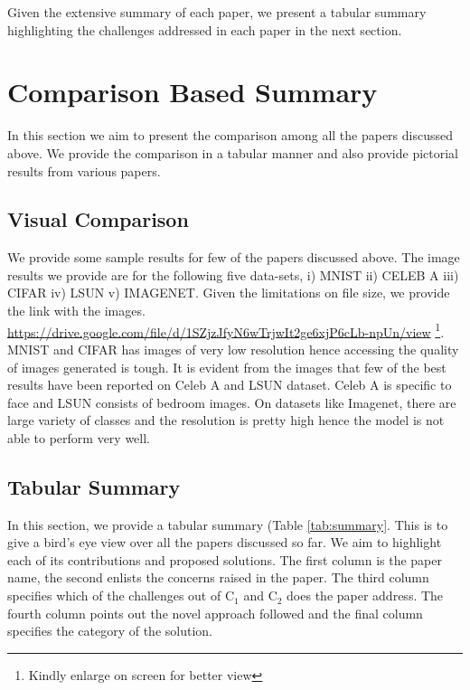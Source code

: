Given the extensive summary of each paper, we present a tabular summary highlighting the challenges addressed in each paper in the next section.




\section{Comparison Based Summary}
\label{sec:comparison}
In this section we aim to present the comparison among all the papers discussed above. We provide the comparison in a tabular manner and also provide pictorial results from various papers.

\subsection{Visual Comparison}
\label{sec:vis_summary}
We provide some sample results for few of the papers discussed above. The image results we provide are for the following five data-sets, i) MNIST ii) CELEB A iii) CIFAR iv) LSUN v) IMAGENET.
Given the limitations on file size, we provide the link with the images.
\url{https://drive.google.com/file/d/1SZjzJfyN6wTrjwIt2ge6xjP6cLb-npUn/view} \footnote{Kindly enlarge on screen for better view}. MNIST and CIFAR has images of very low resolution hence accessing the quality of images generated is tough. It is evident from the images that few of the best results have been reported on Celeb A and LSUN dataset. Celeb A is specific to face and LSUN consists of bedroom images. On datasets like Imagenet, there are large variety of classes and the resolution is pretty high hence the model is not able to perform very well.  
\subsection{Tabular Summary}
\label{ssec:tab_summary}

In this section, we provide a tabular summary (Table \ref{tab:summary}. This is to give a bird's eye view over all the papers discussed so far. We aim to highlight each of its contributions and proposed solutions. The first column is the paper name, the second enlists the concerns raised in the paper. The third column specifies which of the challenges out of C$_1$ and C$_2$ does the paper address. The fourth column points out the novel approach followed and the final column specifies the category of the solution. 

